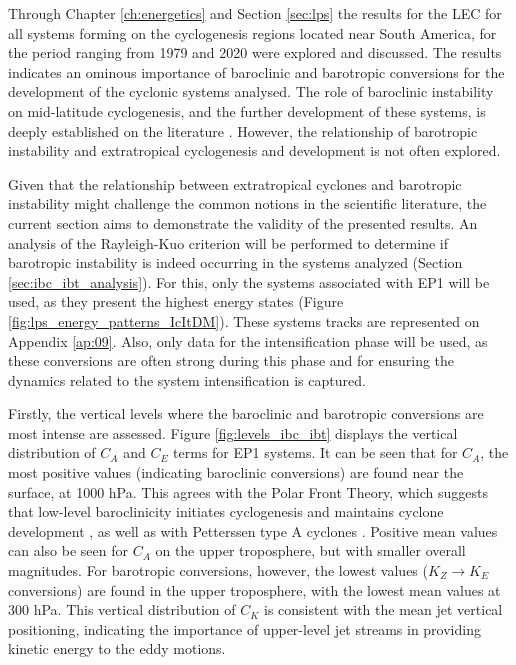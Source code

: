 Through Chapter \ref{ch:energetics} and Section \ref{sec:lps} the results for the LEC for all systems forming on the cyclogenesis regions located near South America, for the period ranging from 1979 and 2020 were explored and discussed. The results indicates an ominous importance of baroclinic and barotropic conversions for the development of the cyclonic systems analysed. The role of baroclinic instability on mid-latitude cyclogenesis, and the further development of these systems, is deeply established on the literature \citep{bjerknes1922life,eady1949long,charney1947dynamics,petterssen1971development,hoskins1990existence}. However, the relationship of barotropic instability and extratropical cyclogenesis and development is not often explored. 

Given that the relationship between extratropical cyclones and barotropic instability might challenge the common notions in the scientific literature, the current section aims to demonstrate the validity of the presented results. An analysis of the Rayleigh-Kuo criterion will be performed to determine if barotropic instability is indeed occurring in the systems analyzed (Section \ref{sec:ibc_ibt_analysis}). For this, only the systems associated with EP1 will be used, as they present the highest energy states (Figure \ref{fig:lps_energy_patterns_IcItDM}). These systems tracks are represented on Appendix \ref{ap:09}. Also, only data for the intensification phase will be used, as these conversions are often strong during this phase and for ensuring the dynamics related to the system intensification is captured.

Firstly, the vertical levels where the baroclinic and barotropic conversions are most intense are assessed. Figure \ref{fig:levels_ibc_ibt} displays the vertical distribution of $C_A$ and $C_E$ terms for EP1 systems. It can be seen that for $C_A$, the most positive values (indicating baroclinic conversions) are found near the surface, at 1000 hPa. This agrees with the Polar Front Theory, which suggests that low-level baroclinicity initiates cyclogenesis and maintains cyclone development \citep{bjerknes1922life}, as well as with Petterssen type A cyclones \citep{petterssen1971development}. Positive mean values can also be seen for $C_A$ on the upper troposphere, but with smaller overall magnitudes. For barotropic conversions, however, the lowest values ($K_Z \rightarrow K_E$ conversions) are found in the upper troposphere, with the lowest mean values at 300 hPa. This vertical distribution of $C_K$ is consistent with the mean jet vertical positioning, indicating the importance of upper-level jet streams in providing kinetic energy to the eddy motions. 

